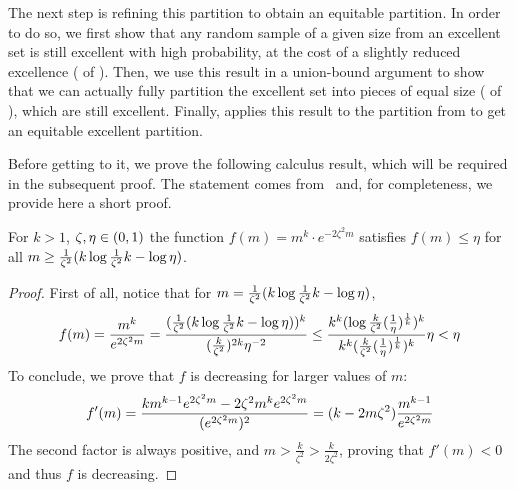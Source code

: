     The next step is refining this partition to obtain an equitable partition.
    In order to do so, we first show that any random sample of a given size from an excellent set is still excellent
    with high probability, at the cost of a slightly reduced excellence ( of
    ).
    Then, we use this result in a union-bound argument to show that we can actually fully partition the excellent set into
    pieces of equal size ( of
    ), which are still excellent.
    Finally,  applies this result to the partition from
     to get an equitable excellent partition.

    Before getting to it, we prove the following calculus result, which will be required in the subsequent proof.
    The statement comes from~\cite{no_me_acuerdo} and, for completeness, we provide here a short proof.

    \begin{lemma} \label{lem:ineq_5.13}
        For $k > 1$, $\zeta, \eta \in ( 0,1 )$ the function $f(m) = m^k \cdot e^{-2 \zeta^2 m}$ satisfies
        $f(m) \leq \eta$ for all $m \geq \frac{1}{\zeta^2}( k \log{\frac{1}{\zeta^2} k} - \log{\eta} )$.
        \begin{proof}
            First of all, notice that for $m = \frac{1}{\zeta^2}( k \log{\frac{1}{\zeta^2} k} - \log{\eta} )$,
            \[
                f(m) = \frac{m^k}{e^{2 \zeta^2 m}}
                     = \frac{( \frac{1}{\zeta^2}( k \log{\frac{1}{\zeta^2} k} - \log{\eta} ) )^k}{
                        ( \frac{k}{\zeta^2} )^{2k} \eta^{-2}}
                     \leq \frac{k^k ( \log{\frac{k}{\zeta^2}( \frac{1}{\eta} )^{\frac{1}{k}}} )^k}
                        {k^k ( \frac{k}{\zeta^2} ( \frac{1}{\eta} )^{\frac{1}{k}} )^k} \eta
                     < \eta
            \]
            To conclude, we prove that $f$ is decreasing for larger values of $m$:
            \[
                f'(m)
                    = \frac{k m^{k-1} e^{2 \zeta^2 m} - 2 \zeta^2 m^k e^{2 \zeta^2 m}}{( e^{2 \zeta^2 m} )^2}
                    = ( k - 2m\zeta^2 ) \frac{m^{k-1}}{e^{2 \zeta^2 m}}
            \]
            The second factor is always positive, and $m > \frac{k}{\zeta^2} > \frac{k}{2\zeta^2}$, proving that $f'(m) < 0$
            and thus $f$ is decreasing.
        \end{proof}
    \end{lemma}

